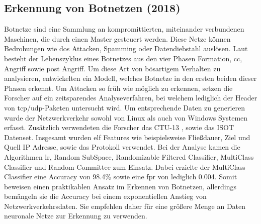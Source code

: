 \documentclass[
    12pt, %
    DIV10,
    ngerman, %
    a4paper, %
    oneside, %
    titlepage, %
    parskip=half, %
    headings=normal, %
    listof=totoc, %
    bibliography=totoc, %
    index=totoc, %
    captions=tableheading, %
    final %
]{scrreprt}
\begin{document}
\subsection{Erkennung von Botnetzen (2018)}\label{ctu}
Botnetze sind eine Sammlung an kompromittierten, miteinander verbundenen Maschinen, die durch einen Master gesteuert werden. Diese Netze können Bedrohungen wie \ac{dos} Attacken, Spamming oder Datendiebstahl auslösen. Laut \textcite{leonard2009framework} besteht der Lebenszyklus eines Botnetzes aus den vier Phasen Formation, \ac{cc}, Angriff sowie post Angriff. Um diese Art von bösartigem Verhalten zu analysieren, entwickelten \textcite{Mathur2018} ein Modell, welches Botnetze in den ersten beiden dieser Phasen erkennt. Um Attacken so früh wie möglich zu erkennen, setzen die Forscher auf ein zeitsparendes Analyseverfahren, bei welchem lediglich der Header von \ac{tcp}/\ac{udp}-Paketen untersucht wird. Um entsprechende Daten zu generieren wurde der Netzwerkverkehr sowohl von Linux als auch von Windows Systemen erfasst. Zusätzlich verwendeten die Forscher das CTU-13 \parencite{garcia2014empirical}, sowie das ISOT \parencite{isot} Datenset. Insgesamt wurden elf Features wie beispielsweise Flie{\ss}dauer, Ziel und Quell IP Adresse, sowie das Protokoll verwendet. Bei der Analyse kamen die Algorithmen \ac{lr}, Random SubSpace, Randomizable Filtered Classifier, MultiClass Classifier und Random Committee zum Einsatz. Dabei erzielte der MultiClass Classifier eine Accuracy von 98.4\% sowie eine \ac{fpr} von lediglich 0.004. Somit beweisen \textcite{Mathur2018} einen praktikablen Ansatz im Erkennen von Botnetzen, allerdings bemängeln sie die Accuracy bei einem exponentiellen Anstieg von Netzwerkverkehrsdaten. Sie empfehlen daher für eine grö{\ss}ere Menge an Daten neuronale Netze zur Erkennung zu verwenden.
%
\end{document}

